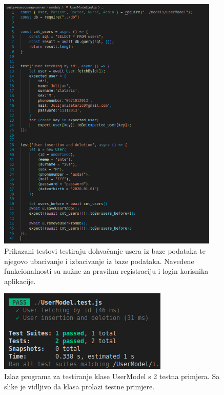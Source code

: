             \begin{figure}[H]
                    \includegraphics[width=300pt]{slike/usermodel_tests_code.png} %
                    \caption{Prikazani testovi testiraju dohvačanje usera iz baze podataka te njegovo ubacivanje i izbacivanje iz baze podataka. Navedene funkcionalnosti su nužne za pravilnu registraciju i login korisnika aplikacije.}
                    \label{fig:struktura} %
                \end{figure}

                \begin{figure}[H]
                    \includegraphics[width=\textwidth]{slike/usermodel_tests_out.png} %
                    \caption{Izlaz programa za testiranje klase UserModel s 2 testna primjera. Sa slike je vidljivo da klasa prolazi testne primjere.}
                    \label{fig:struktura} %
                \end{figure}


